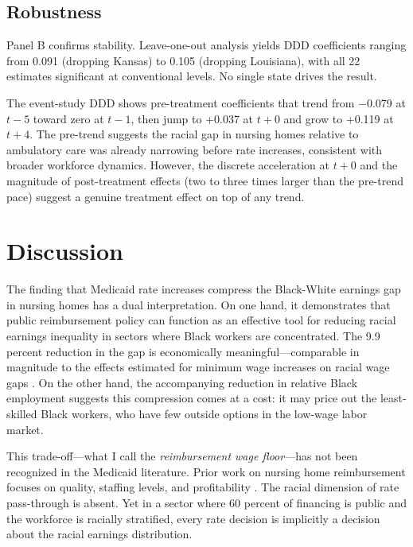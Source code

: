\documentclass[12pt]{article}
\begin{document}
\subsection{Robustness}



 Panel B confirms stability. Leave-one-out analysis yields DDD coefficients ranging from 0.091 (dropping Kansas) to 0.105 (dropping Louisiana), with all 22 estimates significant at conventional levels. No single state drives the result.

The event-study DDD shows pre-treatment coefficients that trend from $-$0.079 at $t-5$ toward zero at $t-1$, then jump to +0.037 at $t+0$ and grow to +0.119 at $t+4$. The pre-trend suggests the racial gap in nursing homes relative to ambulatory care was already narrowing before rate increases, consistent with broader workforce dynamics. However, the discrete acceleration at $t+0$ and the magnitude of post-treatment effects (two to three times larger than the pre-trend pace) suggest a genuine treatment effect on top of any trend.

\section{Discussion}

The finding that Medicaid rate increases compress the Black-White earnings gap in nursing homes has a dual interpretation. On one hand, it demonstrates that public reimbursement policy can function as an effective tool for reducing racial earnings inequality in sectors where Black workers are concentrated. The 9.9 percent reduction in the gap is economically meaningful---comparable in magnitude to the effects estimated for minimum wage increases on racial wage gaps \citep{Derenoncourt2021}. On the other hand, the accompanying reduction in relative Black employment suggests this compression comes at a cost: it may price out the least-skilled Black workers, who have few outside options in the low-wage labor market.

This trade-off---what I call the \textit{reimbursement wage floor}---has not been recognized in the Medicaid literature. Prior work on nursing home reimbursement focuses on quality, staffing levels, and profitability \citep{Grabowski2004, Werner2012, Hackmann2019}. The racial dimension of rate pass-through is absent. Yet in a sector where 60 percent of financing is public and the workforce is racially stratified, every rate decision is implicitly a decision about the racial earnings distribution.
\end{document}
